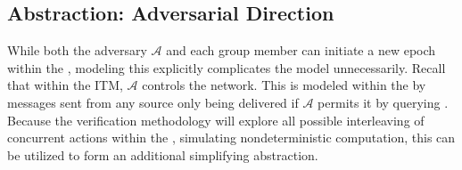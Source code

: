 \documentclass[runningheads]{llncs}
\newcommand{\Abrev}[1]{\gls{#1}}
\newcommand{\Adversary}{\ensuremath{\mathcal{A}}\xspace}
\begin{document}


\subsection{Abstraction: Adversarial Direction}
While both the adversary \Adversary and each group member can initiate a new epoch within the \CGKAsec, modeling this explicitly complicates the model unnecessarily.
Recall that within the \Abrev{ITM}, \Adversary controls the network.
This is modeled within the \CGKAsec by messages sent from any source only being delivered if \Adversary permits it by querying .
Because the verification methodology will explore all possible interleaving of concurrent actions within the \CGKAsec, simulating nondeterministic computation, this can be utilized to form an additional simplifying abstraction.
\end{document}
